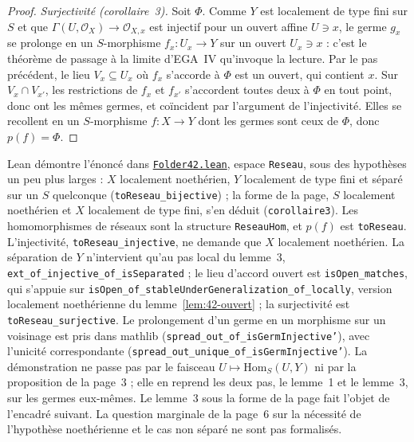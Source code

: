 \begin{proof}
\emph{Surjectivité (corollaire~3).} Soit $\Phi$. Comme $Y$ est localement de type fini sur $S$ et que $\Gamma(U, \mathcal O_X) \to \mathcal O_{X,x}$ est injectif pour un ouvert affine $U \ni x$, le germe $g_x$ se prolonge en un $S$-morphisme $f_x : U_x \to Y$ sur un ouvert $U_x \ni x$ : c'est le théorème de passage à la limite d'EGA~IV qu'invoque la lecture. Par le pas précédent, le lieu $V_x \subseteq U_x$ où $f_x$ s'accorde à $\Phi$ est un ouvert, qui contient $x$. Sur $V_x \cap V_{x'}$, les restrictions de $f_x$ et $f_{x'}$ s'accordent toutes deux à $\Phi$ en tout point, donc ont les mêmes germes, et coïncident par l'argument de l'injectivité. Elles se recollent en un $S$-morphisme $f : X \to Y$ dont les germes sont ceux de $\Phi$, donc $p(f) = \Phi$.
\end{proof}

\begin{remarque}
Lean démontre l'énoncé dans \href{\leanblob/Topology/Folder42.lean}{\texttt{Folder42.\allowbreak{}lean}}, espace \texttt{Reseau}, sous des hypothèses un peu plus larges : $X$ localement noethérien, $Y$ localement de type fini et séparé sur un $S$ quelconque (\texttt{toReseau\_bijective}) ; la forme de la page, $S$ localement noethérien et $X$ localement de type fini, s'en déduit (\texttt{corollaire3}). Les homomorphismes de réseaux sont la structure \texttt{ReseauHom}, et $p(f)$ est \texttt{toReseau}. L'injectivité, \texttt{toReseau\_injective}, ne demande que $X$ localement noethérien. La séparation de $Y$ n'intervient qu'au pas local du lemme~3, \texttt{ext\_of\_injective\_of\_isSeparated} ; le lieu d'accord ouvert est \texttt{isOpen\_matches}, qui s'appuie sur \texttt{isOpen\_of\_stableUnderGeneralization\_of\_locally}, version localement noethérienne du lemme~\ref{lem:42-ouvert} ; la surjectivité est \texttt{toReseau\_surjective}. Le prolongement d'un germe en un morphisme sur un voisinage est pris dans mathlib (\texttt{spread\_out\_of\_isGermInjective'}), avec l'unicité correspondante (\texttt{spread\_out\_unique\_of\_isGermInjective'}). La démonstration ne passe pas par le faisceau $U \mapsto \mathrm{Hom}_S(U, Y)$ ni par la proposition de la page~3 ; elle en reprend les deux pas, le lemme~1 et le lemme~3, sur les germes eux-mêmes. Le lemme~3 sous la forme de la page fait l'objet de l'encadré suivant. La question marginale de la page~6 sur la nécessité de l'hypothèse noethérienne et le cas non séparé ne sont pas formalisés.
\end{remarque}

